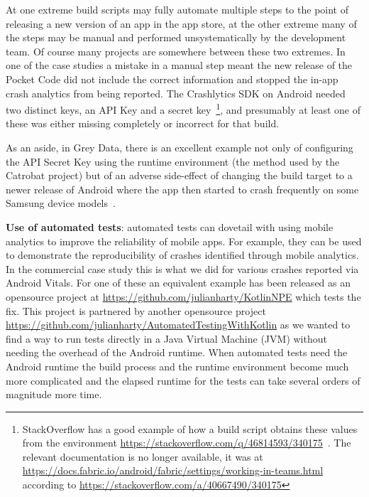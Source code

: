 At one extreme build scripts may fully automate multiple steps to the point of releasing a new version of an app in the app store, at the other extreme many of the steps may be manual and performed unsystematically by the development team. Of course many projects are somewhere between these two extremes. In one of the case studies a mistake in a manual step meant the new release of the Pocket Code did not include the correct information and stopped the in-app crash analytics from being reported. The Crashlytics SDK on Android needed two distinct keys, an API Key and a secret key~\footnote{StackOverflow has a good example of how a build script obtains these values from the environment \url{https://stackoverflow.com/q/46814593/340175}~\citep{scott2017_android_app_crash_noclassdeffounderror_on_samsung_lollipop_devices}. The relevant documentation is no longer available, it was at \url{https://docs.fabric.io/android/fabric/settings/working-in-teams.html} according to \url{https://stackoverflow.com/a/40667490/340175}}, and presumably at least one of these was either missing completely or incorrect for that build.

As an aside, in Grey Data, there is an excellent example not only of configuring the API Secret Key using the runtime environment (the method used by the Catrobat project) but of an adverse side-effect of changing the build target to a newer release of Android where the app then started to crash frequently on some Samsung device models~\citep{scott2017_android_app_crash_noclassdeffounderror_on_samsung_lollipop_devices}. 

\textbf{Use of automated tests}: automated tests can dovetail with using mobile analytics to improve the reliability of mobile apps. For example, they can be used to demonstrate the reproducibility of crashes identified through mobile analytics. In the commercial case study this is what we did for various crashes reported via Android Vitals. For one of these an equivalent example has been released as an opensource project at \url{https://github.com/julianharty/KotlinNPE} which tests the fix. This project is partnered by another opensource project \url{https://github.com/julianharty/AutomatedTestingWithKotlin} as we wanted to find a way to run tests directly in a Java Virtual Machine (JVM) without needing the overhead of the Android runtime. When automated tests need the Android runtime the build process and the runtime environment become much more complicated and the elapsed runtime for the tests can take several orders of magnitude more time.

